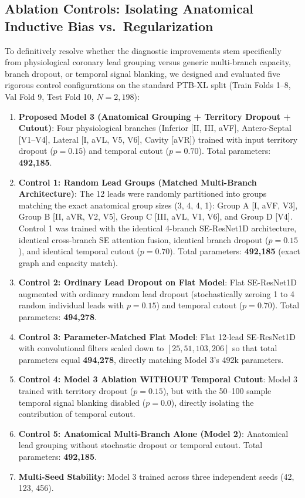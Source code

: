 \documentclass[12pt]{elsarticle}
\begin{document}
\subsection{Ablation Controls: Isolating Anatomical Inductive Bias vs.\ Regularization}
\label{sec:ablation_study}
To definitively resolve whether the diagnostic improvements stem specifically from physiological coronary lead grouping versus generic multi-branch capacity, branch dropout, or temporal signal blanking, we designed and evaluated five rigorous control configurations on the standard PTB-XL split (Train Folds 1--8, Val Fold 9, Test Fold 10, $N = 2,198$):
\begin{enumerate}
    \item \textbf{Proposed Model 3 (Anatomical Grouping + Territory Dropout + Cutout)}: Four physiological branches (Inferior [II, III, aVF], Antero-Septal [V1--V4], Lateral [I, aVL, V5, V6], Cavity [aVR]) trained with input territory dropout ($p=0.15$) and temporal cutout ($p=0.70$). Total parameters: \textbf{492,185}.
    \item \textbf{Control 1: Random Lead Groups (Matched Multi-Branch Architecture)}: The 12 leads were randomly partitioned into groups matching the exact anatomical group sizes (3, 4, 4, 1): Group A [I, aVF, V3], Group B [II, aVR, V2, V5], Group C [III, aVL, V1, V6], and Group D [V4]. Control 1 was trained with the identical 4-branch SE-ResNet1D architecture, identical cross-branch SE attention fusion, identical branch dropout ($p=0.15$), and identical temporal cutout ($p=0.70$). Total parameters: \textbf{492,185} (exact graph and capacity match).
    \item \textbf{Control 2: Ordinary Lead Dropout on Flat Model}: Flat SE-ResNet1D augmented with ordinary random lead dropout (stochastically zeroing 1 to 4 random individual leads with $p=0.15$) and temporal cutout ($p=0.70$). Total parameters: \textbf{494,278}.
    \item \textbf{Control 3: Parameter-Matched Flat Model}: Flat 12-lead SE-ResNet1D with convolutional filters scaled down to $[25, 51, 103, 206]$ so that total parameters equal \textbf{494,278}, directly matching Model 3's 492k parameters.
    \item \textbf{Control 4: Model 3 Ablation WITHOUT Temporal Cutout}: Model 3 trained with territory dropout ($p=0.15$), but with the 50--100 sample temporal signal blanking disabled ($p=0.0$), directly isolating the contribution of temporal cutout.
    \item \textbf{Control 5: Anatomical Multi-Branch Alone (Model 2)}: Anatomical lead grouping without stochastic dropout or temporal cutout. Total parameters: \textbf{492,185}.
    \item \textbf{Multi-Seed Stability}: Model 3 trained across three independent seeds (42, 123, 456).
\end{enumerate}
\end{document}
